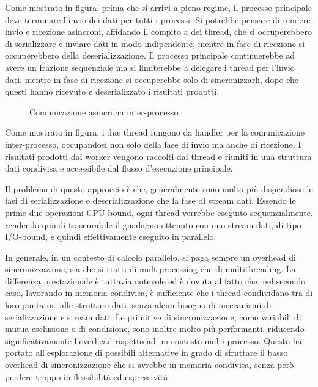 Come mostrato in figura, prima che si arrivi a pieno regime, il processo
principale deve terminare l'invio dei dati per tutti i processi. Si potrebbe
pensare di rendere invio e ricezione asincroni, affidando il compito a dei
thread, che si occuperebbero di serializzare e inviare dati in modo
indipendente, mentre in fase di ricezione si occuperebbero della
deserializzazione. Il processo principale continuerebbe ad avere un frazione
sequenziale ma si limiterebbe a delegare i thread per l'invio dati, mentre in
fase di ricezione si occuperebbe solo di sincronizzarli, dopo che questi hanno
ricevuto e deserializzato i risultati prodotti.

\begin{figure}[H]
	\centering
	
	\caption{Comunicazione asincrona inter-processo}
	\label{fig: async_IPC}
\end{figure}

Come mostrato in figura, i due thread fungono da handler per la comunicazione
inter-processo, occupandosi non solo della fase di invio ma anche di ricezione.
I risultati prodotti dai worker vengono raccolti dai thread e riuniti in una
struttura dati condivisa e accessibile dal flusso d'esecuzione principale.

Il problema di questo approccio è che, generalmente sono molto più dispendiose
le fasi di serializzazione e deserializzazione che la fase di stream dati.
Essendo le prime due operazioni CPU-bound, ogni thread verrebbe eseguito
sequenzialmente, rendendo quindi trascurabile il guadagno ottenuto con uno
stream dati, di tipo I/O-bound, e quindi effettivamente eseguito in parallelo.

In generale, in un contesto di calcolo parallelo, si paga sempre un overhead di
sincronizzazione, sia che si tratti di multiprocessing che di multithreading.
La differenza prestazionale è tuttavia notevole ed è dovuta al fatto che, nel
secondo caso, lavorando in memoria condivisa, è sufficiente che i thread
condividano tra di loro puntatori alle strutture dati, senza alcun bisogno di
meccanismi di serializzazione e stream dati. Le primitive di sincronizzazione,
come variabili di mutua esclusione o di condizione, sono inoltre molto più
performanti, riducendo significativamente l'overhead rispetto ad un contesto
multi-processo. Questo ha portato all'esplorazione di possibili alternative
in grado di sfruttare il basso overhead di sincronizzazione che si avrebbe in
memoria condivisa, senza però perdere troppo in flessibilità ed espressività.
